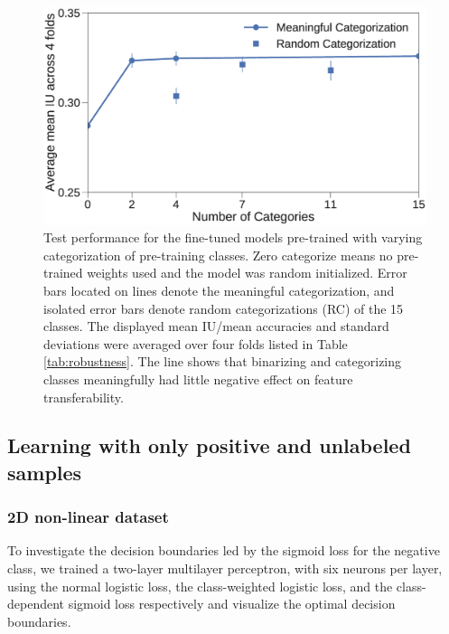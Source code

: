\begin{figure}[t]
\centering
   \includegraphics[width=1.\linewidth]{img/num_classes.eps}
\caption{
Test performance for the fine-tuned models pre-trained with varying categorization of pre-training classes.
Zero categorize means no pre-trained weights used and the model was random initialized.
Error bars located on lines denote the meaningful categorization, and isolated error bars denote random categorizations (RC) of the 15 classes.
The displayed mean IU/mean accuracies and standard deviations were averaged over four folds listed in Table \ref{tab:robustness}.
The line shows that binarizing and categorizing classes meaningfully had little negative effect on feature transferability.
}
\label{fig:categories}
\end{figure}



\subsection{Learning with only positive and unlabeled samples}
\label{subsec:pulearning}


\subsubsection{2D non-linear dataset}

To investigate the decision boundaries led by the sigmoid loss for the negative class, we trained a two-layer multilayer perceptron, with six neurons per layer, using the normal logistic loss, the class-weighted logistic loss, and the class-dependent sigmoid loss respectively and visualize the optimal decision boundaries.


